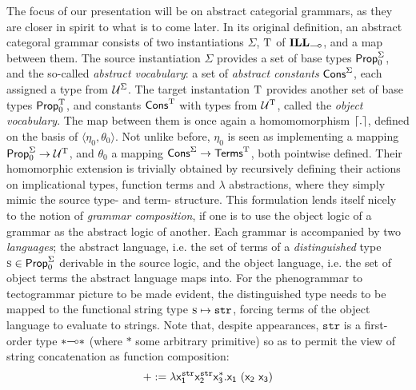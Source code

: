 The focus of our presentation will be on abstract categorial grammars, as they are closer in spirit to what is to come later.
In its original definition, an abstract categoral grammar consists of two instantiations $\Sigma$, $\mathrm{T}$ of $\ILL_{\li}$, and a map between them.
The source instantiation $\Sigma$ provides a set of base types $\mathsf{Prop}_0^{\Sigma}$, and the so-called \textit{abstract vocabulary}: a set of \textit{abstract constants} $\mathsf{Cons}^{\Sigma}$, each assigned a type from $\mathcal{U}^{\Sigma}$.
The target instantation $\mathrm{T}$ provides another set of base types $\mathsf{Prop}_0^{\mathrm{T}}$, and constants $\mathsf{Cons}^{\mathrm{T}}$ with types from $\mathcal{U}^{\mathrm{T}}$, called the \textit{object vocabulary}.
The map between them is once again a homomomorphism $\lceil{.}\rceil$, defined on the basis of $\langle \eta_0, \theta_0\rangle$.
Not unlike before, $\eta_0$ is seen as implementing a mapping $\mathsf{Prop}_0^{\Sigma} \to \mathcal{U}^{\mathrm{T}}$, and $\theta_0$ a mapping $\mathsf{Cons}^{\Sigma}\to \mathsf{Terms}^{\mathrm{T}}$, both pointwise defined.
Their homomorphic extension is trivially obtained by recursively defining their actions on implicational types, function terms and $\lambda$ abstractions, where they simply mimic the source type- and term- structure.
This formulation lends itself nicely to the notion of \textit{grammar composition}, if one is to use the object logic of a grammar as the abstract logic of another.
Each grammar is accompanied by two \textit{languages}; the abstract language, i.e. the set of terms of a \textit{distinguished} type $\smallprop{s}\in \propcon^{\Sigma}$ derivable in the source logic, and the object language, i.e. the set of object terms the abstract language maps into.
For the phenogrammar to tectogrammar picture to be made evident, the distinguished type needs to be mapped to the functional string type $\smallprop{s} \mapsto \mathtt{str}$, forcing terms of the object language to evaluate to strings.
Note that, despite appearances, $\mathtt{str}$ is a first-order type $*\li *$ (where $*$ some arbitrary primitive) so as to permit the view of string concatenation as function composition:
\[
+ := \lambda \mathsf{x_1^{\mathtt{str}}x_2^{\mathtt{str}}x_3^{*}.x_1~(x_2~x_3)}
\]

